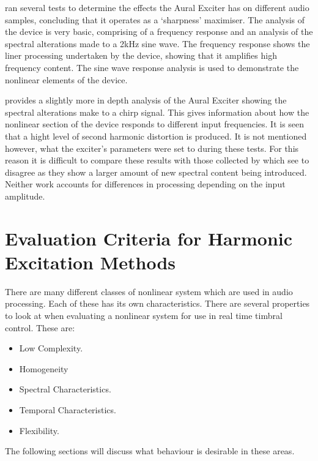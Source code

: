 		\citet{chalupper2000aural} ran several tests to determine the effects the Aural Exciter has on different
		audio samples, concluding that it operates as a `sharpness' maximiser. The analysis of the device is very
		basic, comprising of a frequency response and an analysis of the spectral alterations made to a 2kHz sine
		wave. The frequency response shows the liner processing undertaken by the device, showing that it amplifies
		high frequency content. The sine wave response analysis is used to demonstrate the nonlinear elements of the
		device. 

		\citet{dutilleux2011nonlinear} provides a slightly more in depth analysis of the Aural Exciter showing the
		spectral alterations make to a chirp signal. This gives information about how the nonlinear section of the
		device responds to different input frequencies. It is seen that a hight level of second harmonic distortion
		is produced. It is not mentioned however, what the exciter's parameters were set to during these tests. For
		this reason it is difficult to compare these results with those collected by \citet{chalupper2000aural}
		which see to disagree as they show a larger amount of new spectral content being introduced. Neither work
		accounts for differences in processing depending on the input amplitude.

\section{Evaluation Criteria for Harmonic Excitation Methods} %
\label{sec:Excitation-Evaluation}
	There are many different classes of nonlinear system which are used in audio processing. Each of these has its own
	characteristics. There are several properties to look at when evaluating a nonlinear system for use in real time
	timbral control. These are:

	\begin{itemize}
		\item Low Complexity.
		\item Homogeneity
		\item Spectral Characteristics.
		\item Temporal Characteristics.
		\item Flexibility.
	\end{itemize}

	The following sections will discuss what behaviour is desirable in these areas.

